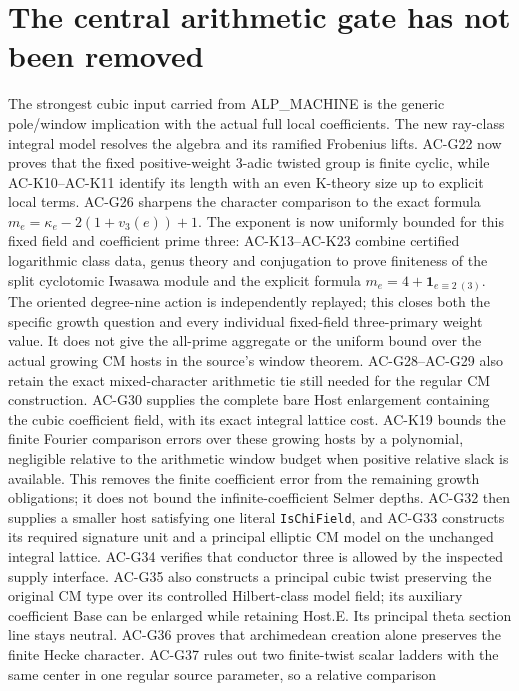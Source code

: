 \documentclass[11pt,a4paper]{article}
\theoremstyle{definition}
\theoremstyle{remark}
\begin{document}
\section{The central arithmetic gate has not been removed}
The strongest cubic input carried from ALP\_MACHINE is the
generic pole/window implication with the actual full local
coefficients. The new ray-class integral model resolves
the algebra and its ramified Frobenius lifts. AC-G22 now
proves that the fixed positive-weight $3$-adic twisted
group is finite cyclic, while AC-K10--AC-K11 identify its
length with an even K-theory size up to explicit local
terms. AC-G26 sharpens the character comparison to the
exact formula $m_e=\kappa_e-2(1+v_3(e))+1$. The exponent
is now uniformly bounded for this fixed field and coefficient
prime three: AC-K13--AC-K23 combine certified logarithmic
class data, genus theory and conjugation to prove finiteness
of the split cyclotomic Iwasawa module and the explicit
formula $m_e=4+\mathbf1_{e\equiv2\ (3)}$.
The oriented degree-nine action is independently replayed;
this closes both the specific growth question and every
individual fixed-field three-primary weight value. It does not give the all-prime
aggregate or the uniform bound over the actual growing
CM hosts in the source's window theorem. AC-G28--AC-G29
also retain the exact mixed-character arithmetic tie still
needed for the regular CM construction. AC-G30 supplies
the complete bare Host enlargement containing the cubic
coefficient field, with its exact integral lattice cost.
AC-K19 bounds the finite Fourier comparison errors over
these growing hosts by a polynomial, negligible relative
to the arithmetic window budget when positive relative
slack is available. This removes the finite coefficient
error from the remaining growth obligations; it does not
bound the infinite-coefficient Selmer depths.
AC-G32 then supplies a smaller host satisfying one literal
\texttt{IsChiField}, and AC-G33 constructs its required
signature unit and a principal elliptic CM model on the
unchanged integral lattice. AC-G34 verifies that conductor three
is allowed by the inspected supply interface. AC-G35 also
constructs a principal cubic twist preserving the original CM type
over its controlled Hilbert-class model field; its auxiliary
coefficient Base can be enlarged while retaining Host.E.
Its principal theta section line stays neutral. AC-G36 proves that
archimedean creation alone preserves the finite Hecke character.
AC-G37 rules out two finite-twist scalar ladders with the same
center in one regular source parameter, so a relative comparison
\end{document}
